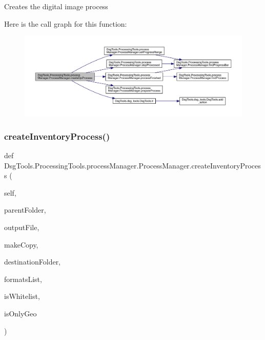 \begin{DoxyVerb}Creates the digital image process
\end{DoxyVerb}
 Here is the call graph for this function\+:
\nopagebreak
\begin{figure}[H]
\begin{center}
\leavevmode
\includegraphics[width=350pt]{class_dsg_tools_1_1_processing_tools_1_1process_manager_1_1_process_manager_ae8be5cb86cdef40fe5c2ed6544fbb235_cgraph}
\end{center}
\end{figure}
\mbox{\label{class_dsg_tools_1_1_processing_tools_1_1process_manager_1_1_process_manager_a28a26a3c90baa1c7416b92c2c34e44c7}} 
\subsubsection{\texorpdfstring{create\+Inventory\+Process()}{createInventoryProcess()}}
{\footnotesize\ttfamily def Dsg\+Tools.\+Processing\+Tools.\+process\+Manager.\+Process\+Manager.\+create\+Inventory\+Process (\begin{DoxyParamCaption}\item[{}]{self,  }\item[{}]{parent\+Folder,  }\item[{}]{output\+File,  }\item[{}]{make\+Copy,  }\item[{}]{destination\+Folder,  }\item[{}]{formats\+List,  }\item[{}]{is\+Whitelist,  }\item[{}]{is\+Only\+Geo }\end{DoxyParamCaption})}

